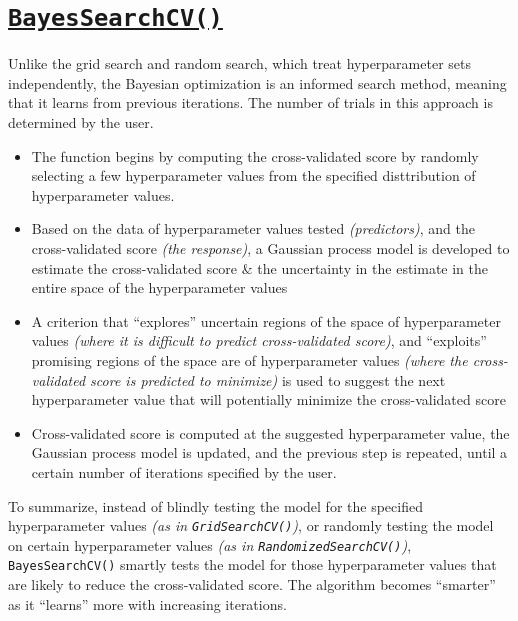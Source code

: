 \documentclass[
  letterpaper,
  DIV=11,
  numbers=noendperiod]{scrreprt}
\providecommand{\tightlist}{%
  \setlength{\itemsep}{0pt}\setlength{\parskip}{0pt}}\usepackage{longtable,booktabs,array}
\begin{document}
\section{\texorpdfstring{\href{https://scikit-optimize.github.io/stable/modules/generated/skopt.BayesSearchCV.html}{\texttt{BayesSearchCV()}}}{BayesSearchCV()}}\label{bayessearchcv-1}

Unlike the grid search and random search, which treat hyperparameter
sets independently, the Bayesian optimization is an informed search
method, meaning that it learns from previous iterations. The number of
trials in this approach is determined by the user.

\begin{itemize}
\tightlist
\item
  The function begins by computing the cross-validated score by randomly
  selecting a few hyperparameter values from the specified disttribution
  of hyperparameter values.
\item
  Based on the data of hyperparameter values tested \emph{(predictors)},
  and the cross-validated score \emph{(the response)}, a Gaussian
  process model is developed to estimate the cross-validated score \&
  the uncertainty in the estimate in the entire space of the
  hyperparameter values
\item
  A criterion that ``explores'' uncertain regions of the space of
  hyperparameter values \emph{(where it is difficult to predict
  cross-validated score)}, and ``exploits'' promising regions of the
  space are of hyperparameter values \emph{(where the cross-validated
  score is predicted to minimize)} is used to suggest the next
  hyperparameter value that will potentially minimize the
  cross-validated score
\item
  Cross-validated score is computed at the suggested hyperparameter
  value, the Gaussian process model is updated, and the previous step is
  repeated, until a certain number of iterations specified by the user.
\end{itemize}

To summarize, instead of blindly testing the model for the specified
hyperparameter values \emph{(as in \texttt{GridSearchCV()})}, or
randomly testing the model on certain hyperparameter values \emph{(as in
\texttt{RandomizedSearchCV()})}, \texttt{BayesSearchCV()} smartly tests
the model for those hyperparameter values that are likely to reduce the
cross-validated score. The algorithm becomes ``smarter'' as it
``learns'' more with increasing iterations.
\end{document}
